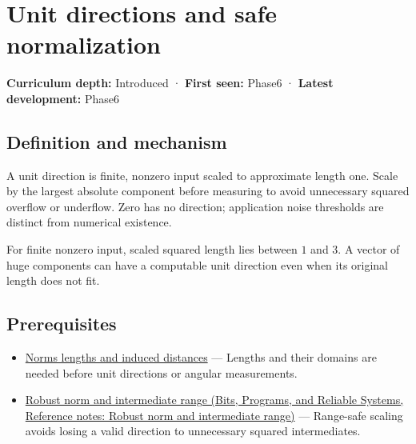 \hypertarget{appendix-f744e41b95b4}{}\label{referencestart:appendix-f744e41b95b4}
\section{Unit directions and safe normalization}\label{appendix-f744e41b95b4-unit-directions-and-safe-normalization}

\textbf{Curriculum depth:} Introduced · \textbf{First seen:} Phase6 · \textbf{Latest development:} Phase6

\begin{allmightroledefinition}

\subsection{Definition and mechanism}\label{appendix-f744e41b95b4-definition-and-mechanism}

A unit direction is finite, nonzero input scaled to approximate length one. Scale by the largest absolute component before measuring to avoid unnecessary squared overflow or underflow. Zero has no direction; application noise thresholds are distinct from numerical existence.

\end{allmightroledefinition}

For finite nonzero input, scaled squared length lies between \(1\) and \(3\). A vector of huge components can have a computable unit direction even when its original length does not fit.

\subsection{Prerequisites}\label{appendix-f744e41b95b4-prerequisites}

\begin{itemize}
\tightlist
\item
  \hyperref[appendix-49933872bb51]{Norms lengths and induced distances} --- Lengths and their domains are needed before unit directions or angular measurements.
\item
  \href{../01-Bits-Programs-and-Reliable-Systems/main.pdf\#nameddest=appendix-7f1e17dcafb1}{Robust norm and intermediate range (Bits, Programs, and Reliable Systems, Reference notes: Robust norm and intermediate range)} --- Range-safe scaling avoids losing a valid direction to unnecessary squared intermediates.
\end{itemize}

